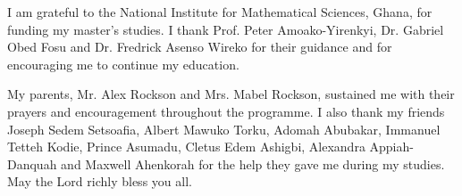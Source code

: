 I am grateful to the National Institute for Mathematical Sciences, Ghana, for funding my master's studies. I thank Prof. Peter Amoako-Yirenkyi, Dr. Gabriel Obed Fosu and Dr. Fredrick Asenso Wireko for their guidance and for encouraging me to continue my education.

My parents, Mr. Alex Rockson and Mrs. Mabel Rockson, sustained me with their prayers and encouragement throughout the programme. I also thank my friends Joseph Sedem Setsoafia, Albert Mawuko Torku, Adomah Abubakar, Immanuel Tetteh Kodie, Prince Asumadu, Cletus Edem Ashigbi, Alexandra Appiah-Danquah and Maxwell Ahenkorah for the help they gave me during my studies. May the Lord richly bless you all.

